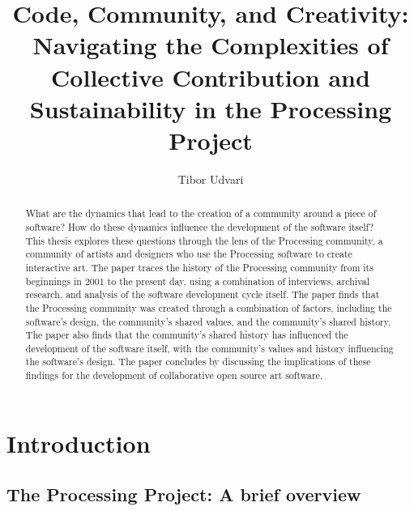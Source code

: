 \documentclass[draft]{article}
\title{Code, Community, and Creativity: Navigating the Complexities of Collective Contribution and Sustainability in the Processing Project}
\author{Tibor Udvari}
\begin{document}
\maketitle

\begin{abstract}
What are the dynamics that lead to the creation of a community around a piece of software? How do these dynamics influence the development of the software itself? This thesis explores these questions through the lens of the Processing community, a community of artists and designers who use the Processing software to create interactive art. The paper traces the history of the Processing community from its beginnings in 2001 to the present day, using a combination of interviews, archival research, and analysis of the software development cycle itself. The paper finds that the Processing community was created through a combination of factors, including the software's design, the community's shared values, and the community's shared history. The paper also finds that the community's shared history has influenced the development of the software itself, with the community's values and history influencing the software's design. The paper concludes by discussing the implications of these findings for the development of collaborative open source art software.
\end{abstract}

\newpage

\section{Introduction}


\subsection{The Processing Project: A brief overview}
\end{document}
